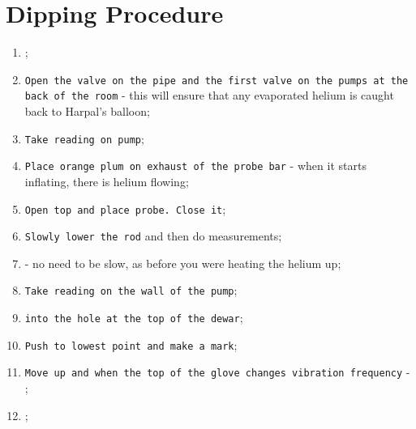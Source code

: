 
\newpage\section{Dipping Procedure}
\label{sec:dipping-procedure}

\begin{enumerate}
\item {};
\item  \texttt{Open the valve on the pipe and the first valve on the pumps at the back of the room} - this will ensure that any evaporated helium is caught back to Harpal's balloon;
\item \texttt{Take reading on pump};
  \item \texttt{Place orange plum on exhaust of the probe bar} - when it starts inflating, there is helium flowing;
\item \texttt{Open top and place probe. Close it};
\item \texttt{Slowly lower the rod} and then do measurements;
\item {} - no need to be slow, as before you were heating the helium up;
\item \texttt{Take reading on the wall of the pump};
\item \texttt{\ec into the hole at the top of the dewar};
\item \texttt{Push to lowest point and make a mark};
\item \texttt{Move up and when the top of the glove changes vibration frequency} - \ec;
\item {};
\end{enumerate} 
